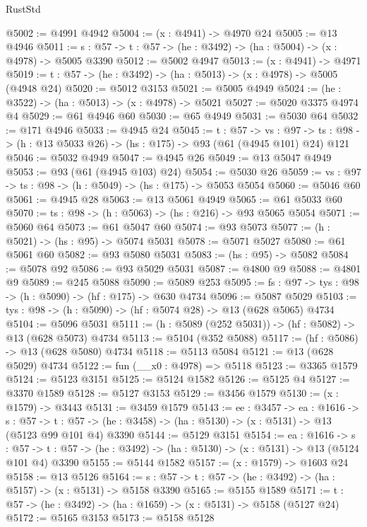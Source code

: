 \begin{lexlean}{RustStd}
\begin{coremodule}
@5002 := @4991 @4942
@5004 := (x : @4941) -> @4970 @24
@5005 := @13 @4946
@5011 := {s : @57} -> {t : @57} -> (he : @3492) -> (ha : @5004) -> (x : @4978) -> @5005 @3390
@5012 := @5002 @4947
@5013 := (x : @4941) -> @4971
@5019 := {t : @57} -> (he : @3492) -> (ha : @5013) -> (x : @4978) -> @5005 (@4948 @24)
@5020 := @5012 @3153
@5021 := @5005 @4949
@5024 := (he : @3522) -> (ha : @5013) -> (x : @4978) -> @5021
@5027 := @5020 @3375 @4974 @4
@5029 := @61 @4946 @60
@5030 := @65 @4949
@5031 := @5030 @64
@5032 := @171 @4946
@5033 := @4945 @24
@5045 := {t : @57} ->
  {vs : @97} -> {ts : @98} -> (h : @13 @5033 @26) -> (hs : @175) -> @93 (@61 (@4945 @101) @24) @121
@5046 := @5032 @4949
@5047 := @4945 @26
@5049 := @13 @5047 @4949
@5053 := @93 (@61 (@4945 @103) @24)
@5054 := @5030 @26
@5059 := {vs : @97} -> {ts : @98} -> (h : @5049) -> (hs : @175) -> @5053 @5054
@5060 := @5046 @60
@5061 := @4945 @28
@5063 := @13 @5061 @4949
@5065 := @61 @5033 @60
@5070 := {ts : @98} -> (h : @5063) -> (hs : @216) -> @93 @5065 @5054
@5071 := @5060 @64
@5073 := @61 @5047 @60
@5074 := @93 @5073
@5077 := (h : @5021) -> (hs : @95) -> @5074 @5031
@5078 := @5071 @5027
@5080 := @61 @5061 @60
@5082 := @93 @5080 @5031
@5083 := (hs : @95) -> @5082
@5084 := @5078 @92
@5086 := @93 @5029 @5031
@5087 := @4800 @9
@5088 := @4801 @9
@5089 := @245 @5088
@5090 := @5089 @253
@5095 := {fs : @97} -> {tys : @98} -> (h : @5090) -> (hf : @175) -> @630 @4734
@5096 := @5087 @5029
@5103 := {tys : @98} -> (h : @5090) -> (hf : @5074 @28) -> @13 (@628 @5065) @4734
@5104 := @5096 @5031
@5111 := (h : @5089 (@252 @5031)) -> (hf : @5082) -> @13 (@628 @5073) @4734
@5113 := @5104 (@352 @5088)
@5117 := (hf : @5086) -> @13 (@628 @5080) @4734
@5118 := @5113 @5084
@5121 := @13 (@628 @5029) @4734
@5122 := fun (__x0 : @4978) => @5118
@5123 := @3365 @1579
@5124 := @5123 @3151
@5125 := @5124 @1582
@5126 := @5125 @4
@5127 := @3370 @1589
@5128 := @5127 @3153
@5129 := @3456 @1579
@5130 := (x : @1579) -> @3443
@5131 := @3459 @1579
@5143 := {ee : @3457} ->
  {ea : @1616} ->
  {s : @57} ->
  {t : @57} -> (he : @3458) -> (ha : @5130) -> (x : @5131) -> @13 (@5123 @99 @101 @4) @3390
@5144 := @5129 @3151
@5154 := {ea : @1616} ->
  {s : @57} -> {t : @57} -> (he : @3492) -> (ha : @5130) -> (x : @5131) -> @13 (@5124 @101 @4) @3390
@5155 := @5144 @1582
@5157 := (x : @1579) -> @1603 @24
@5158 := @13 @5126
@5164 := {s : @57} -> {t : @57} -> (he : @3492) -> (ha : @5157) -> (x : @5131) -> @5158 @3390
@5165 := @5155 @1589
@5171 := {t : @57} -> (he : @3492) -> (ha : @1659) -> (x : @5131) -> @5158 (@5127 @24)
@5172 := @5165 @3153
@5173 := @5158 @5128

\end{coremodule}
\end{lexlean}
